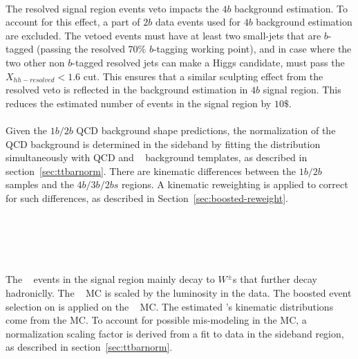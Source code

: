 \paragraph{} 
The resolved signal region events veto impacts the $4b$ background estimation. 
To account for this effect, a part of $2b$ data events used for $4b$ background estimation are excluded.
The vetoed events must have at least two small-\R jets that are $b$-tagged (passing the resolved $70\%$ $b$-tagging working point), and in case where the two other non $b$-tagged resolved jets can make a Higgs candidate, must pass the $X_{hh-resolved} < 1.6$ cut.
This ensures that a similar sculpting effect from the resolved veto is reflected in the background estimation in $4b$ signal region.
This reduces the estimated number of events in the signal region by $10\$$.

\paragraph{}
Given the $1b/2b$ QCD background shape predictions, the normalization of the QCD background is determined in the sideband by fitting the \mleadJ distribution simultaneously with QCD and \ttbar~ background templates, as described in section~\ref{sec:ttbarnorm}.
There are kinematic differences between the $1b/2b$ samples and the $4b/3b/2bs$ regions.  
A kinematic reweighting is applied to correct for such differences, as described in Section~\ref{sec:boosted-reweight}.


\section{\ttbar~}
\label{sec:boosted-ttbar}

\paragraph{}
The \ttbar~ events in the signal region mainly decay to $W^{\pm}$s that further decay hadroniclly.
The \ttbar~ MC is scaled by the luminosity in the data.
The boosted event selection on is applied on the \ttbar~ MC.
The estimated \ttbar's kinematic distributions come from the MC.
To account for possible mis-modeling in the MC, a normalization scaling factor is derived from a fit to data in the sideband region, as described in section~\ref{sec:ttbarnorm}.

